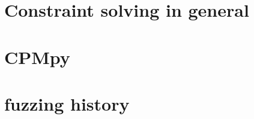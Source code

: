 \section{Constraint solving in general}
\label{intro:ConstraintSolving}

\section{CPMpy}
\label{intro:CPMpy}

\section{fuzzing history} %
\label{intro:fuzzinghistory}


